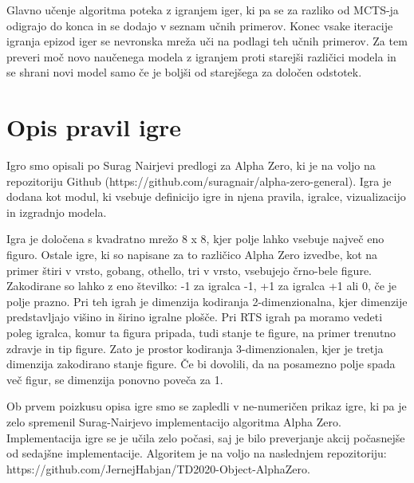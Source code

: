 \documentclass[a4paper, 12pt]{book}
\begin{document}
Glavno učenje algoritma poteka z igranjem iger, ki pa se za razliko od MCTS-ja odigrajo do konca in se dodajo v seznam učnih primerov.
Konec vsake iteracije igranja epizod iger se nevronska mreža uči na podlagi teh učnih primerov.
Za tem preveri moč novo naučenega modela z igranjem proti starejši različici modela in se shrani novi model samo če je boljši od starejšega za določen odstotek.

\chapter{Opis pravil igre}
\label{chpravilaigre}

Igro smo opisali po Surag Nairjevi predlogi za Alpha Zero, ki je na voljo na repozitoriju Github (https://github.com/suragnair/alpha-zero-general).
Igra je dodana kot modul, ki vsebuje definicijo igre in njena pravila, igralce, vizualizacijo in izgradnjo modela.

Igra je določena s kvadratno mrežo 8 x 8, kjer polje lahko vsebuje največ eno figuro.
Ostale igre, ki so napisane za to različico Alpha Zero izvedbe, kot na primer štiri v vrsto, gobang, othello, tri v vrsto, vsebujejo črno-bele figure.
Zakodirane so lahko z eno številko: -1 za igralca -1, +1 za igralca +1 ali 0, če je polje prazno.
Pri teh igrah je dimenzija kodiranja 2-dimenzionalna, kjer dimenzije predstavljajo višino in širino igralne plošče.
Pri RTS igrah pa moramo vedeti poleg igralca, komur ta figura pripada, tudi stanje te figure, na primer trenutno zdravje in tip figure.
Zato je prostor kodiranja 3-dimenzionalen, kjer je tretja dimenzija zakodirano stanje figure.
Če bi dovolili, da na posamezno polje spada več figur, se dimenzija ponovno poveča za 1.



Ob prvem poizkusu opisa igre smo se zapledli v ne-numeričen prikaz igre, ki pa je zelo spremenil Surag-Nairjevo implementacijo algoritma Alpha Zero.
Implementacija igre se je učila zelo počasi, saj je bilo preverjanje akcij počasnejše od sedajšne implementacije.
Algoritem je na voljo na naslednjem repozitoriju:\\
https://github.com/JernejHabjan/TD2020-Object-AlphaZero.
\end{document}
